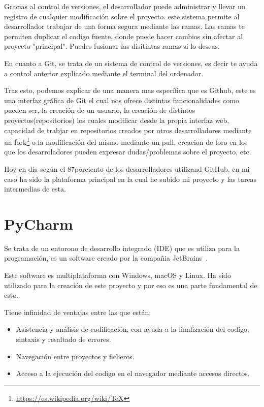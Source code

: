 \documentclass[a4paper, 12pt]{book}
\begin{document}
Gracias al control de versiones, el desarrollador puede administrar y llevar un registro de cualquier modificación sobre el proyecto. este sistema permite al desarrollador trabajar de una forma segura mediante las ramas. Las ramas te permiten duplicar el codigo fuente, donde puede hacer cambios sin afectar al proyecto "principal". Puedes fusionar las disitintas ramas si lo deseas.

En cuanto a Git, se trata de un sistema de control de versiones, es decir te ayuda a control anterior explicado mediante el terminal del ordenador.

Tras esto, podemos explicar de una manera mas específica que es Github, este es una interfaz gráfica de Git el cual nos ofrece distintas funcionalidades como pueden ser, la creación de un usuario, la creación de distintos proyectos(repositorios) los cuales modificar desde la propia interfaz web, capacidad de trabjar en repositorios creados por otros desarrolladores mediante un fork\footnote{\url{https://es.wikipedia.org/wiki/TeX}} o la modificación del mismo mediante un pull, creacion de foro en los que los desarroladores pueden expresar dudas/problemas sobre el proyecto, etc.

Hoy en día según el 87porciento de los desarrolladores utilizand GitHub, en mi caso ha sido la plataforma principal en la cual he subido mi proyecto y las tareas intermedias de esta.


\section{PyCharm} %
\label{sec:GitHub}
Se trata de un entorono de desarrollo integrado (IDE) que es utiliza para la programación, es un software creado por la compañia JetBrains~\cite{jetbrains}.

Este software es multiplataforma con Windows, macOS y Linux. Ha sido utilizado para la creación de este proyecto y por eso es una parte fundamental de esto.

Tiene infinidad de ventajas entre las que están:

\begin{itemize}
    \item Asistencia y análisis de codificación, con ayuda a la finalización del codigo, sintaxis y resaltado de errores.
    \item Navegación entre proyectos y ficheros.
    \item Acceso a la ejecución del codigo en el navegador mediante accesos directos.
\end{itemize}
\end{document}
